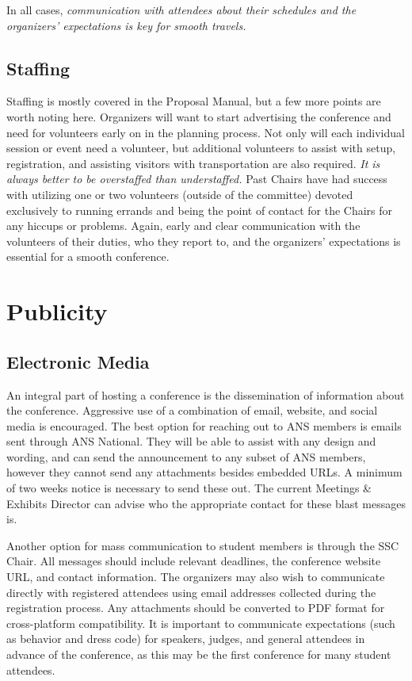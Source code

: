 \documentclass[12pt]{article}
\begin{document}
In all cases, \emph{communication with attendees about their schedules and the organizers' expectations is key for smooth travels.}

\subsection{Staffing}
Staffing is mostly covered in the Proposal Manual, but a few more points are worth noting here.
Organizers will want to start advertising the conference and need for volunteers early on in the planning process.
Not only will each individual session or event need a volunteer, but additional volunteers to assist with setup, registration, and assisting visitors with transportation are also required.
\emph{It is always better to be overstaffed than understaffed.}
Past Chairs have had success with utilizing one or two volunteers (outside of the committee) devoted exclusively to running errands and being the point of contact for the Chairs for any hiccups or problems.
Again, early and clear communication with the volunteers of their duties, who they report to, and the organizers' expectations is essential for a smooth conference.

\clearpage
\section{Publicity}
\subsection{Electronic Media}
An integral part of hosting a conference is the dissemination of information about the conference.
Aggressive use of a combination of email, website, and social media is encouraged.
The best option for reaching out to ANS members is emails sent through ANS National.
They will be able to assist with any design and wording, and can send the announcement to any subset of ANS members, however they cannot send any attachments besides embedded URLs.
A minimum of two weeks notice is necessary to send these out.
The current Meetings \& Exhibits Director can advise who the appropriate contact for these blast messages is.

Another option for mass communication to student members is through the SSC Chair.
All messages should include relevant deadlines, the conference website URL, and contact information.
The organizers may also wish to communicate directly with registered attendees using email addresses collected during the registration process.
Any attachments should be converted to PDF format for cross-platform compatibility.
It is important to communicate expectations (such as behavior and dress code) for speakers, judges, and general attendees in advance of the conference, as this may be the first conference for many student attendees.
\end{document}
